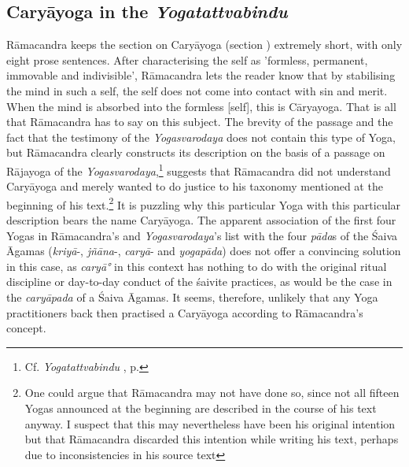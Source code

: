 \subsection{Caryāyoga in the \textit{Yogatattvabindu}}

Rāmacandra keeps the section on Caryāyoga (section ) extremely short, with only eight prose sentences. After characterising the self as 'formless, permanent, immovable and indivisible', Rāmacandra lets the reader know that by stabilising the mind in such a self, the self does not come into contact with sin and merit. When the mind is absorbed into the formless [self], this is Cāryayoga. That is all that Rāmacandra has to say on this subject. The brevity of the passage and the fact that the testimony of the \textit{Yogasvarodaya} does not contain this type of Yoga, but Rāmacandra clearly constructs its description on the basis of a passage on Rājayoga of the \textit{Yogasvarodaya},\footnote{Cf. \textit{Yogatattvabindu} , p. \pageref{caryayoga}} suggests that Rāmacandra did not understand Caryāyoga and merely wanted to do justice to his taxonomy mentioned at the beginning of his text.\footnote{One could argue that Rāmacandra may not have done so, since not all fifteen Yogas announced at the beginning are described in the course of his text anyway. I suspect that this may nevertheless have been his original intention but that Rāmacandra discarded this intention while writing his text, perhaps due to inconsistencies in his source text} It is puzzling why this particular Yoga with this particular description bears the name Caryāyoga. The apparent association of the first four Yogas in Rāmacandra's and \textit{Yogasvarodaya}'s list with the four \textit{pāda}s of the Śaiva Āgamas (\textit{kriyā}-, \textit{jñāna}-, \textit{caryā}- and \textit{yogapāda}) does not offer a convincing solution in this case, as \textit{caryā°} in this context has nothing to do with the original ritual discipline or day-to-day conduct of the śaivite practices, as would be the case in the \textit{caryāpada} of a Śaiva Āgamas. It seems, therefore, unlikely that any Yoga practitioners back then practised a Caryāyoga according to Rāmacandra's concept. 

